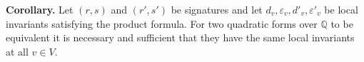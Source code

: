 \textbf{Corollary.} Let $(r,s)$ and $(r',s')$ be signatures and let $d_v, \varepsilon_v, d'_v, \varepsilon'_v$ be local invariants satisfying the product formula. For two quadratic forms over $\mathbb{Q}$ to be equivalent it is necessary and sufficient that they have the same local invariants at all $v \in V$.
